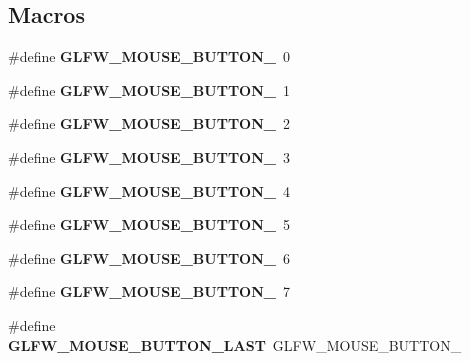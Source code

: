 \subsection*{Macros}
\begin{DoxyCompactItemize}
\item 
\mbox{\label{group__buttons_ga181a6e875251fd8671654eff00f9112e}} 
\#define {\bfseries G\+L\+F\+W\+\_\+\+M\+O\+U\+S\+E\+\_\+\+B\+U\+T\+T\+O\+N\+\_}~0
\item 
\mbox{\label{group__buttons_ga604b39b92c88ce9bd332e97fc3f4156c}} 
\#define {\bfseries G\+L\+F\+W\+\_\+\+M\+O\+U\+S\+E\+\_\+\+B\+U\+T\+T\+O\+N\+\_}~1
\item 
\mbox{\label{group__buttons_ga0130d505563d0236a6f85545f19e1721}} 
\#define {\bfseries G\+L\+F\+W\+\_\+\+M\+O\+U\+S\+E\+\_\+\+B\+U\+T\+T\+O\+N\+\_}~2
\item 
\mbox{\label{group__buttons_ga53f4097bb01d5521c7d9513418c91ca9}} 
\#define {\bfseries G\+L\+F\+W\+\_\+\+M\+O\+U\+S\+E\+\_\+\+B\+U\+T\+T\+O\+N\+\_}~3
\item 
\mbox{\label{group__buttons_gaf08c4ddecb051d3d9667db1d5e417c9c}} 
\#define {\bfseries G\+L\+F\+W\+\_\+\+M\+O\+U\+S\+E\+\_\+\+B\+U\+T\+T\+O\+N\+\_}~4
\item 
\mbox{\label{group__buttons_gae8513e06aab8aa393b595f22c6d8257a}} 
\#define {\bfseries G\+L\+F\+W\+\_\+\+M\+O\+U\+S\+E\+\_\+\+B\+U\+T\+T\+O\+N\+\_}~5
\item 
\mbox{\label{group__buttons_ga8b02a1ab55dde45b3a3883d54ffd7dc7}} 
\#define {\bfseries G\+L\+F\+W\+\_\+\+M\+O\+U\+S\+E\+\_\+\+B\+U\+T\+T\+O\+N\+\_}~6
\item 
\mbox{\label{group__buttons_ga35d5c4263e0dc0d0a4731ca6c562f32c}} 
\#define {\bfseries G\+L\+F\+W\+\_\+\+M\+O\+U\+S\+E\+\_\+\+B\+U\+T\+T\+O\+N\+\_}~7
\item 
\mbox{\label{group__buttons_gab1fd86a4518a9141ec7bcde2e15a2fdf}} 
\#define {\bfseries G\+L\+F\+W\+\_\+\+M\+O\+U\+S\+E\+\_\+\+B\+U\+T\+T\+O\+N\+\_\+\+L\+A\+ST}~G\+L\+F\+W\+\_\+\+M\+O\+U\+S\+E\+\_\+\+B\+U\+T\+T\+O\+N\+\_

\end{DoxyCompactItemize}
